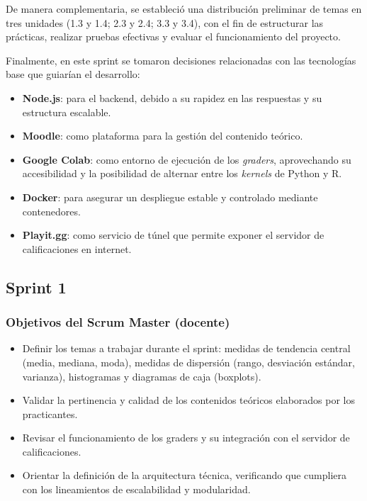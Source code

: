 \documentclass[letter,oneside,12pt,spanish]{report}
\begin{document}
De manera complementaria, se estableció una distribución preliminar de temas en tres unidades (1.3 y 1.4; 2.3 y 2.4; 3.3 y 3.4), con el fin de estructurar las prácticas, realizar pruebas efectivas y evaluar el funcionamiento del proyecto.  

Finalmente, en este sprint se tomaron decisiones relacionadas con las tecnologías base que guiarían el desarrollo:  

\begin{itemize}
	\item \textbf{Node.js}: para el backend, debido a su rapidez en las respuestas y su estructura escalable.  
	\item \textbf{Moodle}: como plataforma para la gestión del contenido teórico.  
	\item \textbf{Google Colab}: como entorno de ejecución de los \textit{graders}, aprovechando su accesibilidad y la posibilidad de alternar entre los \textit{kernels} de Python y R.  
	\item \textbf{Docker}: para asegurar un despliegue estable y controlado mediante contenedores.  
	\item \textbf{Playit.gg}: como servicio de túnel que permite exponer el servidor de calificaciones en internet.  
\end{itemize}



\subsection{Sprint 1}

\subsubsection*{Objetivos del Scrum Master (docente)}
\begin{itemize}
	\item Definir los temas a trabajar durante el sprint: medidas de tendencia central (media, mediana, moda), medidas de dispersión (rango, desviación estándar, varianza), histogramas y diagramas de caja (boxplots).
	\item Validar la pertinencia y calidad de los contenidos teóricos elaborados por los practicantes.
	\item Revisar el funcionamiento de los graders y su integración con el servidor de calificaciones.
	\item Orientar la definición de la arquitectura técnica, verificando que cumpliera con los lineamientos de escalabilidad y modularidad.
\end{itemize}
\end{document}
